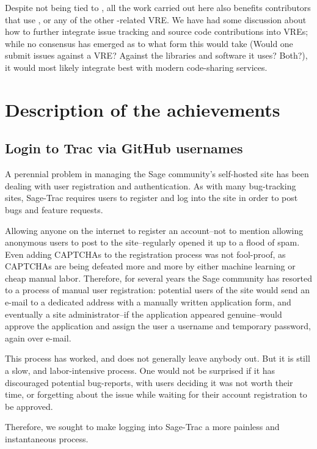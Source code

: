 Despite not being tied to \cocalc, all the work carried out here also
benefits \Sage contributors that use \cocalc, or any of the other \ODK-related VRE.
We have had some discussion about how to further integrate issue tracking and
source code contributions into VREs; while no
consensus has emerged as to what form this would take (Would one submit issues
against a VRE? Against the libraries and software it uses?  Both?), it would
most likely integrate best with modern code-sharing services.


\hypertarget{description-of-the-achievements}{%
\section{Description of the
achievements}\label{description-of-the-achievements}}

\hypertarget{trac-github-login}{%
\subsection{Login to Trac via GitHub usernames}\label{trac-github-login}}
A perennial problem in managing the Sage community's self-hosted \Trac site has
been dealing with user registration and authentication.  As with many
bug-tracking sites, Sage-Trac requires users to register and log into the site
in order to post bugs and feature requests.

Allowing anyone on the internet to register an account--not to mention allowing
anonymous users to post to the site--regularly opened it up to a flood of spam.
Even adding CAPTCHAs to the registration process was not fool-proof, as
CAPTCHAs are being defeated more and more by either machine learning or cheap
manual labor.  Therefore, for several years the Sage community has resorted
to a process of manual user registration: potential users of the site would
send an e-mail to a dedicated address with a manually written application form,
and eventually a site administrator--if the application appeared genuine--would
approve the application and assign the user a username and temporary password,
again over e-mail.

This process has worked, and does not generally leave anybody out.  But it is
still a slow, and labor-intensive process.  One would not be surprised if it
has discouraged potential bug-reports, with users deciding it was not worth
their time, or forgetting about the issue while waiting for their account
registration to be approved.

Therefore, we sought to make logging into Sage-Trac a more painless and
instantaneous process.

